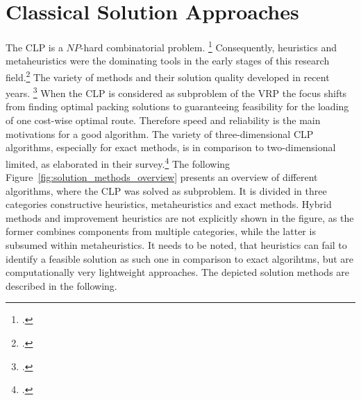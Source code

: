 \section{Classical Solution Approaches}
\label{sec:classical_solution_approaches}
The \gls{CLP} is a $NP$-hard combinatorial problem. \footcite[cf.][p. 11]{bortfeldt_constraints_2013}
Consequently, heuristics and metaheuristics were the dominating tools
in the early stages of this research field.\footcite[cf.][]{pisinger_heuristics_2002} The variety of methods
and their solution quality developed in recent years. \footcite[cf.][p. 23]{iori_exact_2021}
When the \gls{CLP} is considered as subproblem of the \gls{VRP} the focus shifts from finding optimal
packing solutions to guaranteeing feasibility for the loading of one cost-wise optimal route. Therefore
speed and reliability is the main motivations for a good algorithm.
The variety of three-dimensional \gls{CLP} algorithms, especially for exact methods, is in comparison to two-dimensional limited, as
\textcite{zhao_comparative_2016} elaborated in their survey.\footcite[cf.][]{zhao_comparative_2016}
The following Figure~\ref{fig:solution_methods_overview} presents an overview of different algorithms,
where the \gls{CLP} was solved as subproblem.
It is divided in three categories constructive heuristics, metaheuristics
and exact methods. Hybrid methods and improvement heuristics are not explicitly shown in the figure,
as the former combines components from multiple categories, while the latter is subsumed within
metaheuristics. It needs to be noted, that heuristics can fail to identify a feasible solution as such
one in comparison to exact algorihtms, but are computationally very lightweight approaches.
The depicted solution methods are described in the following.



